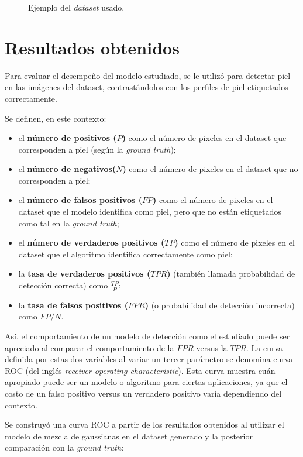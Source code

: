\documentclass[12pt]{article}
\begin{document}
\begin{figure}[h]
    \caption{Ejemplo del \emph{dataset} usado.}
\end{figure}

\section{Resultados obtenidos}

Para evaluar el desempeño del modelo estudiado, se le utilizó para detectar piel
en las imágenes del dataset, contrastándolos con los perfiles de piel
etiquetados correctamente. 

Se definen, en este contexto: 

\begin{itemize}
    \item el \textbf{número de positivos ($P$)} como el número de pixeles en el dataset
        que corresponden a piel (según la \emph{ground truth});
    \item el \textbf{número de negativos($N$)} como el número de pixeles en el dataset
        que no corresponden a piel;
    \item el \textbf{número de falsos positivos ($FP$)} como el número de
        pixeles en el dataset que el modelo identifica como piel, pero que no
        están etiquetados como tal en la \emph{ground truth};
    \item el \textbf{número de verdaderos positivos ($TP$)} como el número de
        pixeles en el dataset que el algoritmo identifica correctamente como
        piel;
    \item la \textbf{tasa de verdaderos positivos ($TPR$)} (también llamada
        probabilidad de detección correcta) como $\frac{TP}{P}$;
    \item la \textbf{tasa de falsos positivos ($FPR$)} (o probabilidad de
        detección incorrecta) como $FP/N$.
\end{itemize}

Así, el comportamiento de un modelo de detección como el estudiado puede ser
apreciado al comparar el comportamiento de la $FPR$ versus la $TPR$. La curva
definida por estas dos variables al variar un tercer parámetro se denomina curva
ROC (del inglés \emph{receiver operating characteristic}). Esta curva muestra
cuán apropiado puede ser un modelo o algoritmo para ciertas aplicaciones, ya que
el costo de un falso positivo versus un verdadero positivo varía dependiendo del
contexto.

Se construyó una curva ROC a partir de los resultados obtenidos al utilizar el modelo de mezcla
de gaussianas en el dataset generado y la posterior comparación con la
\emph{ground truth}:
\end{document}

